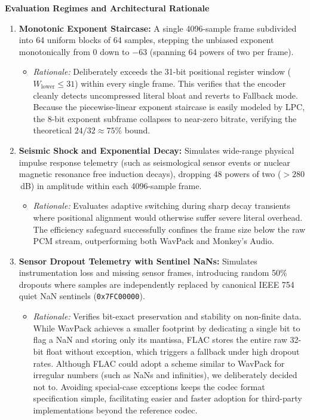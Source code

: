 \documentclass[10pt,twocolumn]{article}
\begin{document}
\noindent\textbf{Evaluation Regimes and Architectural Rationale}

\begin{enumerate}
	\item \textbf{Monotonic Exponent Staircase:}
	      A single 4096-sample frame subdivided into 64 uniform blocks of 64 samples, stepping the unbiased exponent monotonically from 0 down to $-63$ (spanning 64 powers of two per frame).
	      \begin{itemize}
		      \item \textit{Rationale:} Deliberately exceeds the 31-bit positional register window ($W_{\text{lower}} \le 31$) within every single frame. This verifies that the encoder cleanly detects uncompressed literal bloat and reverts to Fallback mode. Because the piecewise-linear exponent staircase is easily modeled by LPC, the 8-bit exponent subframe collapses to near-zero bitrate, verifying the theoretical $24/32 \approx 75\%$ bound.
	      \end{itemize}

	\item \textbf{Seismic Shock and Exponential Decay:}
	      Simulates wide-range physical impulse response telemetry (such as seismological sensor events or nuclear magnetic resonance free induction decays), dropping 48 powers of two ($>280$\,dB) in amplitude within each 4096-sample frame.
	      \begin{itemize}
		      \item \textit{Rationale:} Evaluates adaptive switching during sharp decay transients where positional alignment would otherwise suffer severe literal overhead. The efficiency safeguard successfully confines the frame size below the raw PCM stream, outperforming both WavPack and Monkey's Audio.
	      \end{itemize}

	\item \textbf{Sensor Dropout Telemetry with Sentinel NaNs:}
	      Simulates instrumentation loss and missing sensor frames, introducing random 50\% dropouts where samples are independently replaced by canonical IEEE 754 quiet NaN sentinels (\texttt{0x7FC00000}).
	      \begin{itemize}
		      \item \textit{Rationale:} Verifies bit-exact preservation and stability on non-finite data. While WavPack achieves a smaller footprint by dedicating a single bit to flag a NaN and storing only its mantissa, FLAC stores the entire raw 32-bit float without exception, which triggers a fallback under high dropout rates. Although FLAC could adopt a scheme similar to WavPack for irregular numbers (such as NaNs and infinities), we deliberately decided not to. Avoiding special-case exceptions keeps the codec format specification simple, facilitating easier and faster adoption for third-party implementations beyond the reference codec.
	      \end{itemize}
\end{enumerate}
\end{document}
